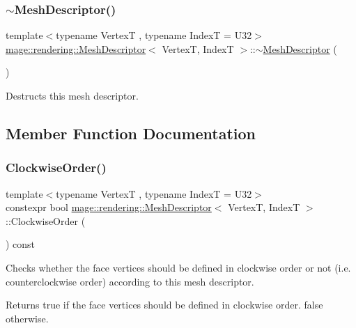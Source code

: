 \subsubsection{\texorpdfstring{$\sim$\+Mesh\+Descriptor()}{~MeshDescriptor()}}
{\footnotesize\ttfamily template$<$typename VertexT , typename IndexT  = U32$>$ \\
\hyperlink{classmage_1_1rendering_1_1_mesh_descriptor}{mage\+::rendering\+::\+Mesh\+Descriptor}$<$ VertexT, IndexT $>$\+::$\sim$\hyperlink{classmage_1_1rendering_1_1_mesh_descriptor}{Mesh\+Descriptor} (\begin{DoxyParamCaption}{ }\end{DoxyParamCaption})\hspace{0.3cm}{\ttfamily [default]}}

Destructs this mesh descriptor. 

\subsection{Member Function Documentation}
\hypertarget{classmage_1_1rendering_1_1_mesh_descriptor_a71ea285cfb0bc3f748038de570e9084e}{}\label{classmage_1_1rendering_1_1_mesh_descriptor_a71ea285cfb0bc3f748038de570e9084e} 
\subsubsection{\texorpdfstring{Clockwise\+Order()}{ClockwiseOrder()}}
{\footnotesize\ttfamily template$<$typename VertexT , typename IndexT  = U32$>$ \\
constexpr bool \hyperlink{classmage_1_1rendering_1_1_mesh_descriptor}{mage\+::rendering\+::\+Mesh\+Descriptor}$<$ VertexT, IndexT $>$\+::Clockwise\+Order (\begin{DoxyParamCaption}{ }\end{DoxyParamCaption}) const\hspace{0.3cm}{\ttfamily [noexcept]}}

Checks whether the face vertices should be defined in clockwise order or not (i.\+e. counterclockwise order) according to this mesh descriptor.

\begin{DoxyReturn}{Returns}
{\ttfamily true} if the face vertices should be defined in clockwise order. {\ttfamily false} otherwise. 
\end{DoxyReturn}
\hypertarget{classmage_1_1rendering_1_1_mesh_descriptor_a0fa7557aa67c69a7978f965bdc913686}{}\label{classmage_1_1rendering_1_1_mesh_descriptor_a0fa7557aa67c69a7978f965bdc913686} 
